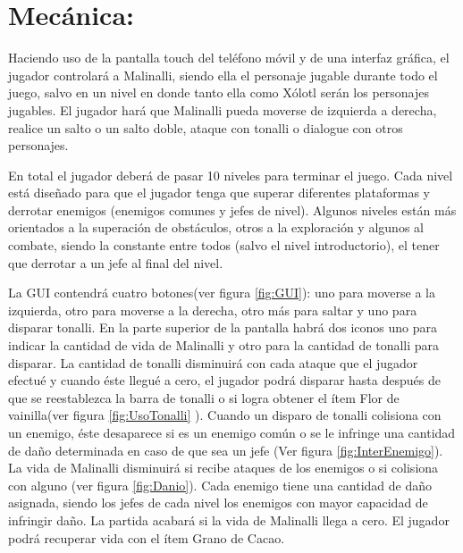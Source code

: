 	\section{Mecánica:}
	Haciendo uso de la pantalla touch del teléfono móvil y de una interfaz gráfica, el jugador controlará a Malinalli, siendo ella el personaje jugable durante todo el juego, salvo en un nivel en donde tanto ella como Xólotl serán los personajes jugables.   El jugador hará que Malinalli pueda moverse de izquierda a derecha, realice un salto o un salto doble, ataque con tonalli o dialogue con otros personajes.
\\
\par
En total el jugador deberá de pasar 10 niveles para terminar el juego. Cada nivel está diseñado para que el jugador tenga que superar diferentes plataformas y derrotar enemigos (enemigos comunes y jefes de nivel). Algunos niveles están más orientados a la superación de obstáculos, otros a la exploración y algunos al combate, siendo la constante entre todos (salvo el nivel introductorio), el tener que derrotar a un jefe al final del nivel.
\\
\par
La GUI contendrá cuatro botones(ver  figura \ref{fig:GUI}): uno para moverse a la izquierda, otro para moverse a la derecha, otro más para saltar y uno para disparar tonalli. En la parte superior de la pantalla habrá dos iconos uno para indicar la cantidad de vida de Malinalli y otro para la cantidad de tonalli para disparar. La cantidad de tonalli disminuirá con cada ataque que el jugador efectué y cuando éste llegué a cero, el jugador podrá disparar hasta después de que se reestablezca la barra de tonalli o si logra obtener el ítem Flor de vainilla(ver figura \ref{fig:UsoTonalli} ). Cuando un disparo de tonalli colisiona con un enemigo, éste desaparece si es un enemigo común o se le infringe una cantidad de daño determinada en caso de que sea un jefe (Ver figura \ref{fig:InterEnemigo}). La vida de Malinalli disminuirá si recibe ataques de los enemigos o si colisiona con alguno (ver figura \ref{fig:Danio}). Cada enemigo tiene una cantidad de daño asignada, siendo los jefes de cada nivel los enemigos con mayor capacidad de infringir daño. La partida acabará si la vida de Malinalli llega a cero. El jugador podrá recuperar vida con el ítem Grano de Cacao.

